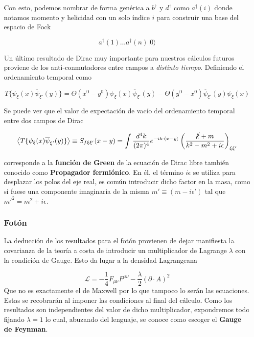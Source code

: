 \documentclass{article}
\numberwithin{equation}{section}
\begin{document}
Con esto, podemos nombrar de forma genérica a $ b^{\dagger} $ y $ d^{\dagger} $ como $ a^{\dagger}(i) $ donde notamos momento y helicidad con un solo índice $ i $ para construir una base del espacio de Fock

\begin{equation}\label{key}
a^{\dagger}(1)\dots a^{\dagger}(n)|0\rangle
\end{equation}  

Un último resultado de Dirac muy importante para nuestros cálculos futuros proviene de los anti-conmutadores entre campos a \textit{distinto tiempo}. Definiendo el ordenamiento temporal como

\begin{equation}\label{key}
T\{\psi_{\xi}(x)\overline{\psi}_{\xi'}(y)\}=\Theta(x^0 - y^0)\psi_{\xi}(x)\overline{\psi}_{\xi'}(y) - \Theta(y^0 - x^0)\overline{\psi}_{\xi'}(y)\psi_{\xi}(x)
\end{equation}

Se puede ver que el valor de expectación de vacío del ordenamiento temporal entre dos campos de Dirac  

\begin{equation}\label{prop_dirac}
\left\langle T\{\psi_{\xi}(x)\overline{\psi}_{\xi'}(y)\} \right\rangle \equiv S_{f \xi \xi'}(x-y)=\int\frac{d^{4}k}{(2\pi)^{4}}e^{-ik\cdot(x-y)}\left(\frac{\cancel{k}+m}{k^2-m^2+i\epsilon}\right)_{\xi\xi'}
\end{equation}

corresponde a la \textbf{función de Green} de la ecuación de Dirac libre también conocido como \textbf{Propagador fermiónico}. En él, el término $ i\epsilon $ se utiliza para desplazar los polos del eje real, es común introducir dicho factor en la masa, como si fuese una componente imaginaria de la misma $ m'\equiv(m-i\epsilon')$ tal que $ m'^2=m^2 + i\epsilon $.

\subsubsection{Fotón}\label{sec_foton}

La deducción de los resultados para el fotón provienen de dejar manifiesta la covarianza de la teoría a costa de introducir un multiplicador de Lagrange $ \lambda $ con la condición de Gauge. Esto da lugar a la densidad Lagrangeana

\begin{equation}\label{key}
\mathscr{L}=-\frac{1}{4}F_{\mu\nu}F^{\mu\nu}-\frac{\lambda}{2}\left(\partial \cdot A\right)^2
\end{equation}
Que no es exactamente el de Maxwell por lo que tampoco lo serán las ecuaciones. Estas se recobrarán al imponer las condiciones al final del cálculo. Como los resultados son independientes del valor de dicho multiplicador, expondremos todo fijando $ \lambda=1 $ lo cual, abuzando del lenguaje, se conoce como escoger el \textbf{Gauge de Feynman}.
\end{document}
